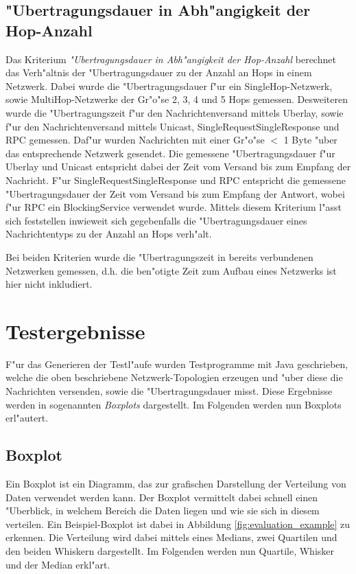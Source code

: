 \subsection{"Ubertragungsdauer in Abh"angigkeit der Hop-Anzahl}

Das Kriterium \emph{"Ubertragungsdauer in Abh"angigkeit der Hop-Anzahl} berechnet das Verh"altnis der "Ubertragungsdauer zu der Anzahl an Hops in einem Netzwerk. Dabei wurde die "Ubertragungsdauer f"ur ein SingleHop-Netzwerk, sowie MultiHop-Netzwerke der Gr"o"se 2, 3, 4 und 5 Hops gemessen. Desweiteren wurde die "Ubertragungszeit f"ur den Nachrichtenversand mittels Uberlay, sowie f"ur den Nachrichtenversand mittels Unicast, SingleRequestSingleResponse und RPC gemessen. Daf"ur wurden Nachrichten mit einer Gr"o"se $<$ 1 Byte "uber das entsprechende Netzwerk gesendet. Die gemessene "Ubertragungsdauer f"ur Uberlay und Unicast entspricht dabei der Zeit vom Versand bis zum Empfang der Nachricht. F"ur SingleRequestSingleResponse und RPC entspricht die gemessene "Ubertragungsdauer der Zeit vom Versand bis zum Empfang der Antwort, wobei f"ur RPC ein BlockingService verwendet wurde. Mittels diesem Kriterium l"asst sich feststellen inwieweit sich gegebenfalls die "Ubertragungsdauer eines Nachrichtentyps zu der Anzahl an Hops verh"alt.  

Bei beiden Kriterien wurde die "Ubertragungszeit in bereits verbundenen Netzwerken gemessen, d.h. die ben"otigte Zeit zum Aufbau eines Netzwerks ist hier nicht inkludiert. 
\section{Testergebnisse}
F"ur das Generieren der Testl"aufe wurden Testprogramme mit Java geschrieben, welche die oben beschriebene Netzwerk-Topologien erzeugen und "uber diese die Nachrichten versenden, sowie die "Ubertragungsdauer misst. Diese Ergebnisse werden in sogenannten \emph{Boxplots} dargestellt. Im Folgenden werden nun Boxplots erl"autert.

\subsection{Boxplot}
Ein Boxplot ist ein Diagramm, das zur grafischen Darstellung der Verteilung von Daten verwendet werden kann. Der Boxplot vermittelt dabei schnell einen "Uberblick, in welchem Bereich die Daten liegen und wie sie sich in diesem verteilen. Ein Beispiel-Boxplot ist dabei in Abbildung \ref{fig:evaluation_example} zu erkennen. Die Verteilung wird dabei mittels eines Medians, zwei Quartilen und den beiden Whiskern dargestellt. Im Folgenden werden nun Quartile, Whisker und der Median erkl"art.

